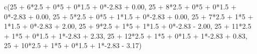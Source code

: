 \documentclass[
  letterpaper,
]{scrbook}
\newenvironment{Shaded}{\begin{snugshade}}{\end{snugshade}}
\newcommand{\DecValTok}[1]{\textcolor[rgb]{0.68,0.00,0.00}{#1}}
\newcommand{\FloatTok}[1]{\textcolor[rgb]{0.68,0.00,0.00}{#1}}
\newcommand{\FunctionTok}[1]{\textcolor[rgb]{0.28,0.35,0.67}{#1}}
\newcommand{\NormalTok}[1]{\textcolor[rgb]{0.00,0.23,0.31}{#1}}
\newcommand{\SpecialCharTok}[1]{\textcolor[rgb]{0.37,0.37,0.37}{#1}}
\begin{document}
\begin{Shaded}
\begin{Highlighting}[]
\FunctionTok{c}\NormalTok{(}\DecValTok{25} \SpecialCharTok{+}  \DecValTok{6}\SpecialCharTok{*}\FloatTok{2.5} \SpecialCharTok{+} \DecValTok{0}\SpecialCharTok{*}\DecValTok{5} \SpecialCharTok{+} \DecValTok{0}\SpecialCharTok{*}\FloatTok{1.5} \SpecialCharTok{+} \DecValTok{0}\SpecialCharTok{*{-}}\FloatTok{2.83} \SpecialCharTok{+} \FloatTok{0.00}\NormalTok{,}
  \DecValTok{25} \SpecialCharTok{+}  \DecValTok{8}\SpecialCharTok{*}\FloatTok{2.5} \SpecialCharTok{+} \DecValTok{0}\SpecialCharTok{*}\DecValTok{5} \SpecialCharTok{+} \DecValTok{0}\SpecialCharTok{*}\FloatTok{1.5} \SpecialCharTok{+} \DecValTok{0}\SpecialCharTok{*{-}}\FloatTok{2.83} \SpecialCharTok{+} \FloatTok{0.00}\NormalTok{,}
  \DecValTok{25} \SpecialCharTok{+}  \DecValTok{5}\SpecialCharTok{*}\FloatTok{2.5} \SpecialCharTok{+} \DecValTok{0}\SpecialCharTok{*}\DecValTok{5} \SpecialCharTok{+} \DecValTok{1}\SpecialCharTok{*}\FloatTok{1.5} \SpecialCharTok{+} \DecValTok{0}\SpecialCharTok{*{-}}\FloatTok{2.83} \SpecialCharTok{+} \FloatTok{0.00}\NormalTok{,}
  \DecValTok{25} \SpecialCharTok{+}  \DecValTok{7}\SpecialCharTok{*}\FloatTok{2.5} \SpecialCharTok{+} \DecValTok{1}\SpecialCharTok{*}\DecValTok{5} \SpecialCharTok{+} \DecValTok{1}\SpecialCharTok{*}\FloatTok{1.5} \SpecialCharTok{+} \DecValTok{0}\SpecialCharTok{*{-}}\FloatTok{2.83} \SpecialCharTok{+} \FloatTok{2.00}\NormalTok{,}
  \DecValTok{25} \SpecialCharTok{+}  \DecValTok{9}\SpecialCharTok{*}\FloatTok{2.5} \SpecialCharTok{+} \DecValTok{1}\SpecialCharTok{*}\DecValTok{5} \SpecialCharTok{+} \DecValTok{1}\SpecialCharTok{*}\FloatTok{1.5} \SpecialCharTok{+} \DecValTok{0}\SpecialCharTok{*{-}}\FloatTok{2.83} \SpecialCharTok{{-}} \FloatTok{2.00}\NormalTok{,}
  \DecValTok{25} \SpecialCharTok{+} \DecValTok{11}\SpecialCharTok{*}\FloatTok{2.5} \SpecialCharTok{+} \DecValTok{1}\SpecialCharTok{*}\DecValTok{5} \SpecialCharTok{+} \DecValTok{0}\SpecialCharTok{*}\FloatTok{1.5} \SpecialCharTok{+} \DecValTok{1}\SpecialCharTok{*{-}}\FloatTok{2.83} \SpecialCharTok{+} \FloatTok{2.33}\NormalTok{,}
  \DecValTok{25} \SpecialCharTok{+} \DecValTok{12}\SpecialCharTok{*}\FloatTok{2.5} \SpecialCharTok{+} \DecValTok{1}\SpecialCharTok{*}\DecValTok{5} \SpecialCharTok{+} \DecValTok{0}\SpecialCharTok{*}\FloatTok{1.5} \SpecialCharTok{+} \DecValTok{1}\SpecialCharTok{*{-}}\FloatTok{2.83} \SpecialCharTok{+} \FloatTok{0.83}\NormalTok{,}
  \DecValTok{25} \SpecialCharTok{+} \DecValTok{10}\SpecialCharTok{*}\FloatTok{2.5} \SpecialCharTok{+} \DecValTok{1}\SpecialCharTok{*}\DecValTok{5} \SpecialCharTok{+} \DecValTok{0}\SpecialCharTok{*}\FloatTok{1.5} \SpecialCharTok{+} \DecValTok{1}\SpecialCharTok{*{-}}\FloatTok{2.83} \SpecialCharTok{{-}} \FloatTok{3.17}\NormalTok{) }
\end{Highlighting}
\end{Shaded}
\end{document}
